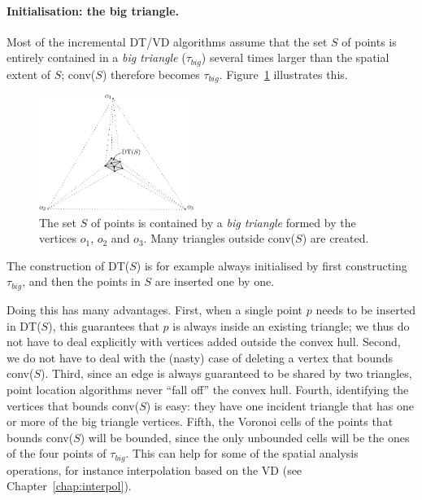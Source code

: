 \paragraph{Initialisation: the big triangle.}
\label{sec:big_tr}
Most of the incremental DT/VD algorithms assume that the set $S$ of points is entirely contained in a \emph{big triangle} ($\tau_{big}$) several times larger than the spatial extent of $S$; conv($S$) therefore becomes $\tau_{big}$. 
Figure~\ref{fig:big_tr} illustrates this.
\begin{figure}
  \centering
  \includegraphics[width=0.45\textwidth]{figs/big_tr}
  \caption[The big triangle containing all the dataset.]{The set $S$ of points is contained by a \emph{big triangle} formed by the vertices $o_1$, $o_2$ and $o_3$. Many triangles outside conv($S$) are created.} 
\label{fig:big_tr}
\end{figure}
The construction of DT($S$) is for example always initialised by first constructing $\tau_{big}$, and then the points in $S$ are inserted one by one. 

%

Doing this has many advantages. 
First, when a single point $p$ needs to be inserted in DT($S$), this guarantees that $p$ is always inside an existing triangle; we thus do not have to deal explicitly with vertices added outside the convex hull. 
Second, we do not have to deal with the (nasty) case of deleting a vertex that bounds conv($S$). 
Third, since an edge is always guaranteed to be shared by two triangles, point location algorithms never ``fall off'' the convex hull. 
Fourth, identifying the vertices that bounds conv($S$) is easy: they have one incident triangle that has one or more of the big triangle vertices.
Fifth, the Voronoi cells of the points that bounds conv($S$) will be bounded, since the only unbounded cells will be the ones of the four points of $\tau_{big}$. 
This can help for some of the spatial analysis operations, for instance interpolation based on the VD (see Chapter~\ref{chap:interpol}).

%

